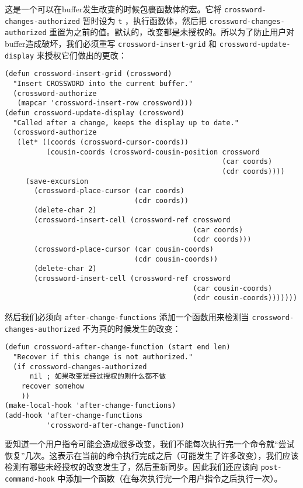 这是一个可以在buffer发生改变的时候包裹函数体的宏。它将 \texttt{crossword-changes-authorized} 暂时设为 \texttt{t} ，执行函数体，然后把 \texttt{crossword-changes-authorized} 重置为之前的值。默认的，改变都是未授权的。所以为了防止用户对buffer造成破坏，我们必须重写 \texttt{crossword-insert-grid} 和 \texttt{crossword-update-display} 来授权它们做出的更改：

\begin{verbatim}
(defun crossword-insert-grid (crossword)
  "Insert CROSSWORD into the current buffer."
  (crossword-authorize
   (mapcar 'crossword-insert-row crossword)))
(defun crossword-update-display (crossword)
  "Called after a change, keeps the display up to date."
  (crossword-authorize
   (let* ((coords (crossword-cursor-coords))
          (cousin-coords (crossword-cousin-position crossword
                                                    (car coords)
                                                    (cdr coords))))
     (save-excursion
       (crossword-place-cursor (car coords)
                               (cdr coords))
       (delete-char 2)
       (crossword-insert-cell (crossword-ref crossword
                                             (car coords)
                                             (cdr coords)))
       (crossword-place-cursor (car cousin-coords)
                               (cdr cousin-coords))
       (delete-char 2)
       (crossword-insert-cell (crossword-ref crossword
                                             (car cousin-coords)
                                             (cdr cousin-coords)))))))
\end{verbatim}

然后我们必须向 \texttt{after-change-functions} 添加一个函数用来检测当 \texttt{crossword-changes-authorized} 不为真的时候发生的改变：

\begin{verbatim}
(defun crossword-after-change-function (start end len)
  "Recover if this change is not authorized."
  (if crossword-changes-authorized
      nil ; 如果改变是经过授权的则什么都不做
    recover somehow
    ))
(make-local-hook 'after-change-functions)
(add-hook 'after-change-functions
          'crossword-after-change-function)
\end{verbatim}

要知道一个用户指令可能会造成很多改变，我们不能每次执行完一个命令就“尝试恢复”几次。这表示在当前的命令执行完成之后（可能发生了许多改变），我们应该检测有哪些未经授权的改变发生了，然后重新同步。因此我们还应该向 \texttt{post-command-hook} 中添加一个函数（在每次执行完一个用户指令之后执行一次）。


